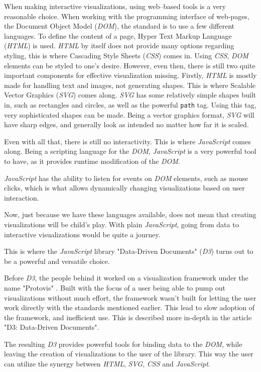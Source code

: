 \documentclass[Report.tex]{subfiles}
\begin{document}
	
	When making interactive visualizations, using web--based tools is a very reasonable choice. When working with the programming interface of web-pages, the Document Object Model (\emph{DOM}), the standard is to use a few different languages. To define the content of a page, Hyper Text Markup Language (\emph{HTML}) is used. \emph{HTML} by itself does not provide many options regarding styling, this is where Cascading Style Sheets (\emph{CSS}) comes in. Using \emph{CSS}, \emph{DOM} elements can be styled to one's desire. However, even then, there is still two quite important components for effective visualization missing. Firstly, \emph{HTML} is mostly made for handling text and images, not generating shapes. This is where Scalable Vector Graphics (\emph{SVG}) comes along. \emph{SVG} has some relatively simple shapes built in, such as rectangles and circles, as well as the powerful \texttt{path} tag. Using this tag, very sophisticated shapes can be made. Being a vector graphics format, \emph{SVG} will have sharp edges, and generally look as intended no matter how far it is scaled.
	
	Even with all that, there is still no interactivity. This is where \emph{JavaScript} comes along. Being a scripting language for the \emph{DOM}, \emph{JavaScript} is a very powerful tool to have, as it provides runtime modification of the \emph{DOM}. 
	
	\emph{JavaScript} has the ability to listen for events on \emph{DOM} elements, such as mouse clicks, which is what allows dynamically changing visualizations based on user interaction.
	
	Now, just because we have these languages available, does not mean that creating visualizations will be child's play. With plain \emph{JavaScript}, going from data to interactive visualizations would be quite a journey.
	
	This is where the \emph{JavaScript} library "Data-Driven Documents" (\emph{D3}) turns out to be a powerful and versatile choice.
	
	Before \emph{D3}, the people behind it worked on a visualization framework under the name "Protovis" \cite{Protovis}. Built with the focus of a user being able to pump out visualizations without much effort, the framework wasn't built for letting the user work directly with the standards mentioned earlier. This lead to slow adoption of the framework, and inefficient use. This is described more in-depth in the article "D3: Data-Driven Documents"\cite{D3}.
	
	
	The resulting \emph{D3} provides powerful tools for binding data to the \emph{DOM}, while leaving the creation of visualizations to the user of the library. This way the user can utilize the synergy between \emph{HTML}, \emph{SVG}, \emph{CSS} and \emph{JavaScript}.
	
\end{document}

